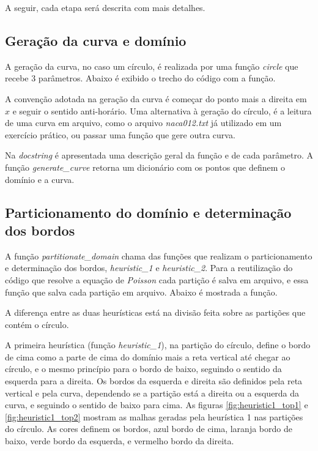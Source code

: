 \documentclass[a4paper]{article}
\begin{document}
A seguir, cada etapa será descrita com mais detalhes.


\subsection{Geração da curva e domínio}

A geração da curva, no caso um círculo, é realizada por uma função \textit{circle} que recebe 3 parâmetros. Abaixo é exibido o trecho do código com a função.


A convenção adotada na geração da curva é começar do ponto mais a direita em $x$ e seguir o sentido anti-horário.
Uma alternativa à geração do círculo, é a leitura de uma curva em arquivo, como o arquivo \textit{naca012.txt} já utilizado em um exercício prático, ou passar uma função que gere outra curva.



Na \textit{docstring} é apresentada uma descrição geral da função e de cada parâmetro.
A função \textit{generate\_curve} retorna um dicionário com os pontos que definem o domínio e a curva.


\subsection{Particionamento do domínio e determinação dos bordos}

A função \textit{partitionate\_domain} chama das funções que realizam o particionamento e determinação dos bordos, \textit{heuristic\_1} e \textit{heuristic\_2}. Para a reutilização do código que resolve a equação de \textit{Poisson} cada partição é salva em arquivo, e essa função que salva cada partição em arquivo.
Abaixo é mostrada a função.


A diferença entre as duas heurísticas está na divisão feita sobre as partições que contém o círculo.

A primeira heurística (função \textit{heuristic\_1}), na partição do círculo, define o bordo de cima como a parte de cima do domínio mais a reta vertical até chegar ao círculo, e o mesmo princípio para o bordo de baixo, seguindo o sentido da esquerda para a direita. Os bordos da esquerda e direita são definidos pela reta vertical e pela curva, dependendo se a partição está a direita ou a esquerda da curva, e seguindo o sentido de baixo para cima.
As figuras \ref{fig:heuristic1_top1} e \ref{fig:heuristic1_top2} mostram as malhas geradas pela heurística 1 nas partições do círculo. As cores definem os bordos, azul bordo de cima, laranja bordo de baixo, verde bordo da esquerda, e vermelho bordo da direita.
\end{document}
